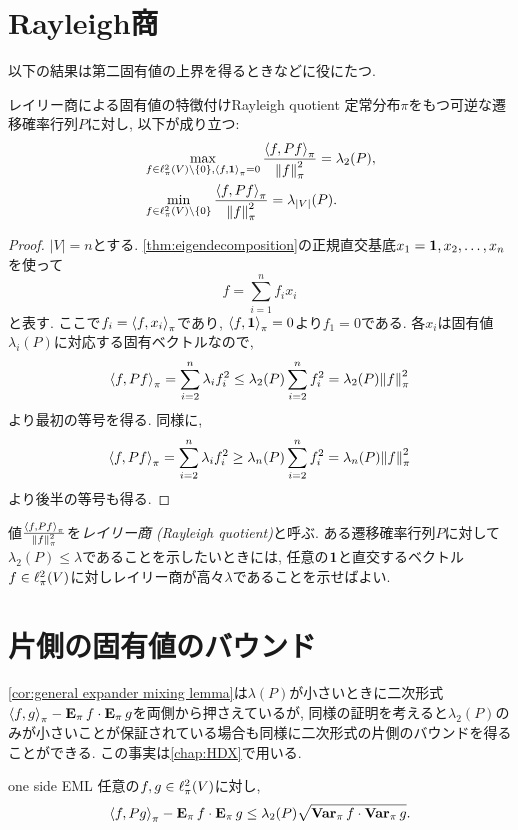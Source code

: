 \section{Rayleigh商} \label{sec:Rayleigh quotient}
以下の結果は第二固有値の上界を得るときなどに役にたつ.
\begin{lemma}{レイリー商による固有値の特徴付け}{Rayleigh quotient}
  定常分布$\pi$をもつ可逆な遷移確率行列$P$に対し, 以下が成り立つ:
  \begin{align*}
    &\max_{f \in \ell^2_\pi(V)\setminus\{0\},\left\langle f,\mathbf{1}\right\rangle_{\pi}=0}\frac{\left\langle f,Pf\right\rangle_{\pi}}{\left\lVert f\right\rVert_{\pi}^2}=\lambda_2(P),\\
    &\min_{f \in \ell^2_\pi(V)\setminus\{0\}}\frac{\left\langle f,Pf\right\rangle_{\pi}}{\left\lVert f\right\rVert_{\pi}^2}=\lambda_{|V|}(P).
  \end{align*}
\end{lemma}
\begin{proof}
  $|V|=n$とする.
  \cref{thm:eigendecomposition}の正規直交基底$x_1=\mathbf{1},x_2,\dots,x_n$を使って
  \[
    f = \sum_{i=1}^n f_i x_i
  \]
  と表す.
  ここで$f_i = \left\langle f,x_i\right\rangle_{\pi}$であり, $\left\langle f,\mathbf{1}\right\rangle_{\pi}=0$より$f_1 =0$である.
  各$x_i$は固有値$\lambda_i(P)$に対応する固有ベクトルなので,
  \begin{align*}
    \piprod{f,Pf} = \sum_{i=2}^n\lambda_i f_i^2 \le \lambda_2(P) \sum_{i=2}^n f_i^2 = \lambda_2(P) \pinorm{f}^2
  \end{align*}
  より最初の等号を得る.
  同様に,
  \begin{align*}
    \piprod{f,Pf} = \sum_{i=2}^n\lambda_i f_i^2 \ge \lambda_n(P) \sum_{i=2}^n f_i^2 = \lambda_n(P) \pinorm{f}^2
  \end{align*}
  より後半の等号も得る.
\end{proof}

値$\frac{\left\langle f,Pf\right\rangle_{\pi}}{\left\lVert f\right\rVert_{\pi}^2}$を\emph{レイリー商 (Rayleigh quotient)}と呼ぶ.
ある遷移確率行列$P$に対して$\lambda_2(P) \le \lambda$であることを示したいときには,
任意の$\mathbf{1}$と直交するベクトル$f\in\ell^2_\pi(V)$に対しレイリー商が高々$\lambda$であることを示せばよい.


\section{片側の固有値のバウンド}
\cref{cor:general expander mixing lemma}は$\lambda(P)$が小さいときに二次形式$\left\langle f,g\right\rangle_{\pi} - \operatorname*{\mathbf{E}_{\pi}} f \cdot \operatorname*{\mathbf{E}_{\pi}} g$を両側から押さえているが,
同様の証明を考えると$\lambda_2(P)$のみが小さいことが保証されている場合も同様に二次形式の片側のバウンドを得ることができる.
この事実は\cref{chap:HDX}で用いる.
\begin{lemma}{}{one side EML}
  任意の$f,g\in \ell^2_\pi(V)$に対し,
  \[
    \left\langle f,Pg\right\rangle_{\pi} - \operatorname*{\mathbf{E}_{\pi}} f\cdot \operatorname*{\mathbf{E}_{\pi}} g \le \lambda_2(P)\sqrt{\operatorname*{\mathbf{Var}_{\pi}} f \cdot \operatorname*{\mathbf{Var}_{\pi}} g}.
  \]
\end{lemma}
